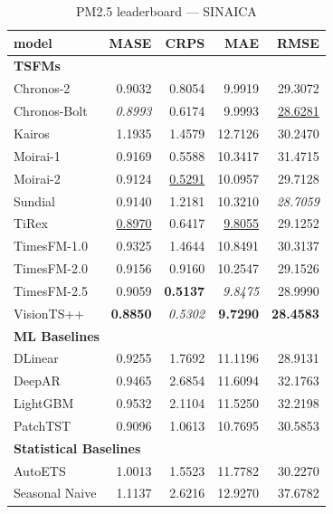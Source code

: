 \begin{table}[H]
\caption{PM2.5 leaderboard --- SINAICA}
\centering
\begin{small}
\begin{tabular}{lrrrr}
\toprule
model & MASE & CRPS & MAE & RMSE \\
\midrule
\multicolumn{5}{l}{\textbf{TSFMs}} \\
Chronos-2 & 0.9032 & 0.8054 & 9.9919 & 29.3072 \\
Chronos-Bolt & \textit{0.8993} & 0.6174 & 9.9993 & \underline{28.6281} \\
Kairos & 1.1935 & 1.4579 & 12.7126 & 30.2470 \\
Moirai-1 & 0.9169 & 0.5588 & 10.3417 & 31.4715 \\
Moirai-2 & 0.9124 & \underline{0.5291} & 10.0957 & 29.7128 \\
Sundial & 0.9140 & 1.2181 & 10.3210 & \textit{28.7059} \\
TiRex & \underline{0.8970} & 0.6417 & \underline{9.8055} & 29.1252 \\
TimesFM-1.0 & 0.9325 & 1.4644 & 10.8491 & 30.3137 \\
TimesFM-2.0 & 0.9156 & 0.9160 & 10.2547 & 29.1526 \\
TimesFM-2.5 & 0.9059 & \textbf{0.5137} & \textit{9.8475} & 28.9990 \\
VisionTS++ & \textbf{0.8850} & \textit{0.5302} & \textbf{9.7290} & \textbf{28.4583} \\
\midrule
\multicolumn{5}{l}{\textbf{ML Baselines}} \\
DLinear & 0.9255 & 1.7692 & 11.1196 & 28.9131 \\
DeepAR & 0.9465 & 2.6854 & 11.6094 & 32.1763 \\
LightGBM & 0.9532 & 2.1104 & 11.5250 & 32.2198 \\
PatchTST & 0.9096 & 1.0613 & 10.7695 & 30.5853 \\
\midrule
\multicolumn{5}{l}{\textbf{Statistical Baselines}} \\
AutoETS & 1.0013 & 1.5523 & 11.7782 & 30.2270 \\
Seasonal Naive & 1.1137 & 2.6216 & 12.9270 & 37.6782 \\
\bottomrule
\end{tabular}
\end{small}
\end{table}